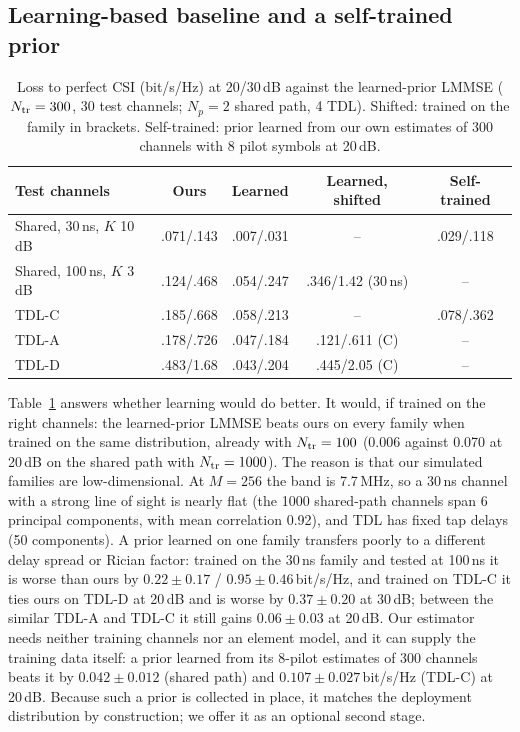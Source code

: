 \documentclass[conference,10pt]{IEEEtran}
\theoremstyle{remark}
\begin{document}
\subsection{Learning-based baseline and a self-trained prior}\label{sec:res-learn}
\begin{table}[t]\centering\footnotesize
\caption{Loss to perfect CSI (bit/s/Hz) at 20/30\,dB against the learned-prior LMMSE ($N_{\rm tr}=300$, 30 test channels;
$N_p=2$ shared path, 4 TDL). Shifted: trained on the family in brackets. Self-trained: prior learned from our own
estimates of 300 channels with 8 pilot symbols at 20\,dB.}\label{tab:learn}
\setlength{\tabcolsep}{2.5pt}
\begin{tabular}{@{}lcccc@{}}\toprule
Test channels & Ours & Learned & Learned, shifted & Self-trained\\\midrule
Shared, 30\,ns, $K$ 10\,dB & .071/.143 & .007/.031 & -- & .029/.118\\
Shared, 100\,ns, $K$ 3\,dB & .124/.468 & .054/.247 & .346/1.42 (30\,ns) & --\\
TDL-C & .185/.668 & .058/.213 & -- & .078/.362\\
TDL-A & .178/.726 & .047/.184 & .121/.611 (C) & --\\
TDL-D & .483/1.68 & .043/.204 & .445/2.05 (C) & --\\\bottomrule
\end{tabular}
\end{table}
Table~\ref{tab:learn} answers whether learning would do better. It would, if trained on the right channels: the
learned-prior LMMSE beats ours on every family when trained on the same distribution, already with $N_{\rm tr}=100$
(0.006 against 0.070 at 20\,dB on the shared path with $N_{\rm tr}=1000$). The reason is that our simulated families
are low-dimensional. At $M=256$ the band is 7.7\,MHz, so a 30\,ns channel with a strong line of sight is nearly flat
(the 1000 shared-path channels span 6 principal components, with mean correlation 0.92), and TDL has fixed tap delays
(50 components). A prior learned on one family transfers poorly to a different delay spread or Rician factor: trained
on the 30\,ns family and tested at 100\,ns it is worse than ours by $0.22\pm0.17$ / $0.95\pm0.46$\,bit/s/Hz, and trained on
TDL-C it ties ours on TDL-D at 20\,dB and is worse by $0.37\pm0.20$ at 30\,dB; between the similar TDL-A and TDL-C it
still gains $0.06\pm0.03$ at 20\,dB. Our estimator needs neither training channels nor an element model, and it can
supply the training data itself: a prior learned from its 8-pilot estimates of 300 channels beats it by
$0.042\pm0.012$ (shared path) and $0.107\pm0.027$\,bit/s/Hz (TDL-C) at 20\,dB. Because such a prior is collected in place,
it matches the deployment distribution by construction; we offer it as an optional second stage.
\end{document}
